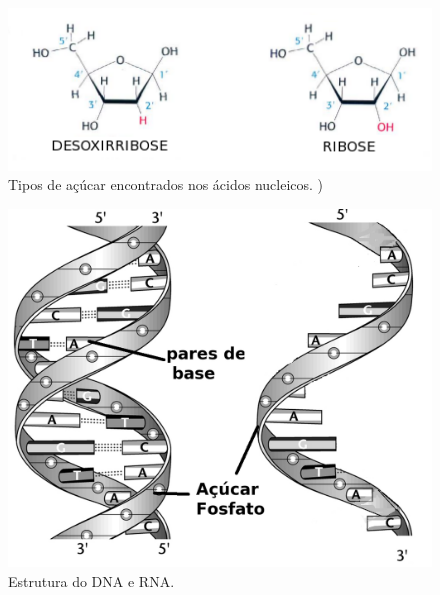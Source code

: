 \begin{figure}[htb!]
    \centering
    \includegraphics[scale=0.7]{./figuras/tipos_acucar.png}
    \caption{Tipos de açúcar encontrados nos ácidos nucleicos. \cite[Adaptada]{Berg2007})}
    \label{fig:tipos_acucar}
\end{figure}


\begin{figure}[htb!]
    \centering
    \includegraphics[scale=0.7]{./figuras/estrutura_DNA_RNA.jpg}
    \caption{Estrutura do DNA e RNA. \cite[Adaptada]{Higgs2005}}
    \label{fig:estrutura_DNA_RNA}
\end{figure}

